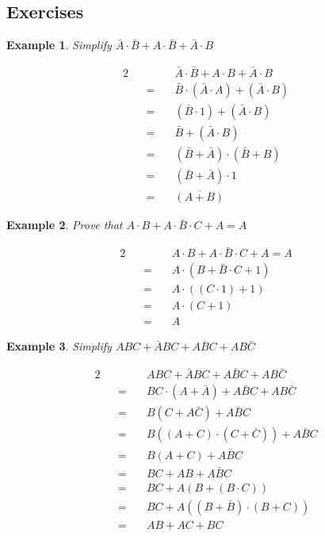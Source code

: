\documentclass[12pt, a4paper]{report}
\newtheorem{example}{Example}
\begin{document}
	\subsection{Exercises}
	\begin{example}
		Simplify $\bar{A} \cdot \bar{B} + A \cdot \bar{B} + \bar{A} \cdot B$
	\end{example}
	\begin{alignat*}{2}
		&   &        & \bar{A}\cdot\bar{B} + A\cdot B + \bar{A} \cdot B \\
		&   & =\quad & \bar{B}\cdot(\bar{A}\cdot A) + (\bar{A} \cdot B) \\
		&   & =\quad & (\bar{B} \cdot 1) + (\bar{A} \cdot B)            \\
		&   & =\quad & \bar{B} + (\bar{A} \cdot B)                      \\
		&   & =\quad & (\bar{B}+\bar{A})  \cdot (\bar{B}+B)             \\
		&   & =\quad & (\bar{B}+\bar{A}) \cdot 1                        \\
		&   & =\quad & \overline{(A+B)} \quad                           
	\end{alignat*}
	\hrulefill
	\newpage
	\begin{example}
		Prove that $A \cdot B + A \cdot \bar{B}  \cdot C+A = A$
	\end{example}
	\begin{alignat*}{2}
		&   &        & A \cdot B + A \cdot \bar{B}  \cdot C+A = A \\
		&   & =\quad & A \cdot(B+ \bar{B} \cdot C + 1)            \\
		&   & =\quad & A  \cdot ( (C \cdot 1)  + 1 )              \\
		&   & =\quad & A \cdot (C+1)                              \\
		&   & =\quad & A                                          
	\end{alignat*}
	\hrulefill
	\begin{example}
		Simplify $ABC + \bar{A}BC+A\bar{B}C + AB\bar{C}$
	\end{example}
	\begin{alignat*}{2}
		&   &        & ABC + \bar{A}BC+A\bar{B}C + AB\bar{C}                 \\
		&   & =\quad & BC \cdot (A+\bar{A}) + A\bar{B}C + AB\bar{C}          \\
		&   & =\quad & B(C+A\bar{C}) + A\bar{B} C                            \\
		&   & =\quad & B\left((A+C)\cdot (C + \bar{C}) \right) + A\bar{B}  C \\
		&   & =\quad & B(A+C) + A\bar{B} C                                   \\
		&   & =\quad & BC + AB + A\bar{B} C                                  \\
		&   & =\quad & BC + A(B+(B\cdot C))                                  \\
		&   & =\quad & BC + A\left((B+\bar{B}) \cdot(B+C)\right)             \\
		&   & =\quad & AB + AC + BC                                          
	\end{alignat*}
	\hrulefill
	\newpage
\end{document}
